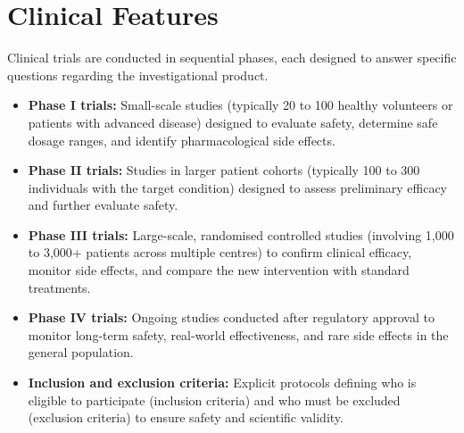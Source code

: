 \section*{Clinical Features}
Clinical trials are conducted in sequential phases, each designed to answer specific questions regarding the investigational product.
\begin{itemize}
    \item \textbf{Phase I trials:} Small-scale studies (typically 20 to 100 healthy volunteers or patients with advanced disease) designed to evaluate safety, determine safe dosage ranges, and identify pharmacological side effects.
    \item \textbf{Phase II trials:} Studies in larger patient cohorts (typically 100 to 300 individuals with the target condition) designed to assess preliminary efficacy and further evaluate safety.
    \item \textbf{Phase III trials:} Large-scale, randomised controlled studies (involving 1,000 to 3,000+ patients across multiple centres) to confirm clinical efficacy, monitor side effects, and compare the new intervention with standard treatments.
    \item \textbf{Phase IV trials:} Ongoing studies conducted after regulatory approval to monitor long-term safety, real-world effectiveness, and rare side effects in the general population.
    \item \textbf{Inclusion and exclusion criteria:} Explicit protocols defining who is eligible to participate (inclusion criteria) and who must be excluded (exclusion criteria) to ensure safety and scientific validity.
\end{itemize}

